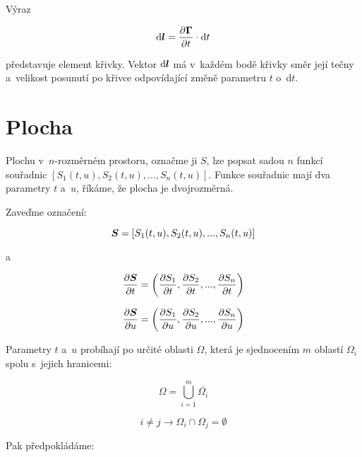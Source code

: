 Výraz 

\begin{equation}
\mathrm{d}\boldsymbol{l} = \frac{\partial \boldsymbol{\Gamma}}{\partial t} \cdot \mathrm{d}t 
\end{equation}

představuje element křivky. Vektor \(\mathrm{d}\boldsymbol{l}\) má v~každém bodě křivky směr její tečny a~velikost posunutí po křivce odpovídající změně parametru \(t\) o~\(\mathrm{d}t\).

\section{Plocha}

Plochu v~\(n\)-rozměrném prostoru, označme ji \(S\), lze popsat sadou \(n\) funkcí souřadnic \([S_1(t, u), S_2(t, u), ..., S_n(t, u)]\). Funkce souřadnic mají dva parametry \(t\) a~\(u\), říkáme, že plocha je dvojrozměrná.

Zaveďme označení:

\begin{equation}
\boldsymbol{S} = [S_1(t, u), S_2(t, u), ..., S_n(t, u)]
\end{equation}

a

\begin{equation}
\frac{\partial \boldsymbol{S}}{\partial t} = \left(\frac{\partial S_1}{\partial t}, \frac{\partial S_2}{\partial t}, ..., \frac{\partial S_n}{\partial t} \right)
\end{equation}

\begin{equation}
\frac{\partial \boldsymbol{S}}{\partial u} = \left(\frac{\partial S_1}{\partial u}, \frac{\partial S_2}{\partial u}, ..., \frac{\partial S_n}{\partial u} \right)
\end{equation}

Parametry \(t\) a~\(u\) probíhají po určité oblasti \(\Omega\), která je sjednocením \(m\) oblastí \(\Omega_i\) spolu s~jejich hranicemi:

\begin{equation}
\Omega = \bigcup_{i=1}^m \overline{\Omega_i}
\end{equation}

\begin{equation}
i \neq j \rightarrow \Omega_i \cap \Omega_j = \emptyset
\end{equation}

Pak předpokládáme:

